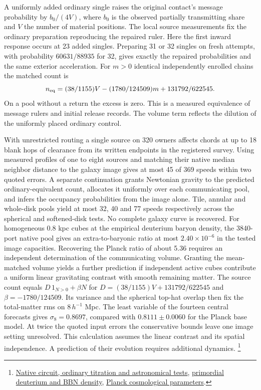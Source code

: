 \documentclass[11pt]{article}
\begin{document}
A uniformly added ordinary single raises the original contact's
message probability by \(b_0/(4V)\), where \(b_0\) is the observed
partially transmitting share and \(V\) the number of material positions.
The local source measurements fix the ordinary preparation reproducing
the repaired ruler. Here the first inward response occurs at 23 added
singles. Preparing 31 or 32 singles on fresh attempts, with probability
\(60631/88935\) for 32, gives exactly the repaired probabilities and
the same exterior acceleration. For \(m>0\) identical independently
enrolled chains the matched count is
\[
n_{\rm eq}=(38/1155)V-(1780/124509)m+131792/622545 .
\]
On a pool without a return the excess is zero. This is a measured
equivalence of message rulers and initial release records. The volume
term reflects the dilution of the uniformly placed ordinary control.

With unrestricted routing a single source on 320 owners affects
chords at up to 18 blank hops of clearance from its written endpoints
in the registered survey. Using measured profiles of one to eight
sources and matching their native median neighbor distance to the
galaxy image gives at most 45 of 369 speeds within two quoted errors.
A separate continuation grants Newtonian gravity to the predicted
ordinary-equivalent count, allocates it uniformly over each communicating
pool, and infers the occupancy probabilities from the image alone.
Tile, annular and whole-disk pools yield at most 32, 40 and 77
speeds respectively across the spherical and softened-disk tests.
No complete galaxy curve is recovered. For homogeneous 0.8 kpc cubes
at the empirical deuterium baryon density, the 3840-port native pool
gives an extra-to-baryonic ratio at most \(2.40\times10^{-6}\) in the
tested image capacities. Recovering the Planck ratio of about 5.36
requires an independent determination of the communicating volume.
Granting the mean-matched volume yields a further prediction if
independent active cubes contribute a uniform linear gravitating
contrast with smooth remaining matter. The source count equals
\(D\,1_{N>0}+\beta N\) for \(D=(38/1155)V+131792/622545\) and
\(\beta=-1780/124509\). Its variance and the spherical top-hat overlap
then fix the total-matter rms on \(8\,h^{-1}\) Mpc. The least variable
of the fourteen central forecasts gives \(\sigma_8=0.8697\), compared
with \(0.8111\pm0.0060\) for the Planck base model. At twice the quoted
input errors the conservative bounds leave one image setting unresolved.
This calculation assumes the linear contrast and its spatial
independence. A prediction of their evolution requires additional
dynamics.%
\footnote{\href{https://github.com/FloatingPragma/observer-patch-holography/blob/main/model/experiments/interval_echo_shell_flux/product_address/green_response/material_recoil/overlap_source/native_boundary/stock/aperture/COLLECTIVE_RESULTS.md}{Native circuit, ordinary titration and astronomical tests},
\href{https://doi.org/10.3847/1538-4357/aaab53}{primordial deuterium and BBN density},
\href{https://arxiv.org/abs/1807.06209}{Planck cosmological parameters}.}
\end{document}
